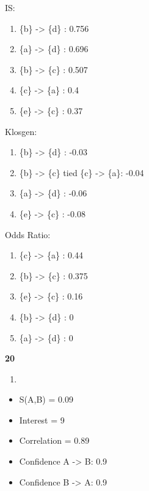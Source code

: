 \documentclass[11pt]{article}
\providecommand{\tightlist}{%
      \setlength{\itemsep}{0pt}\setlength{\parskip}{0pt}}
\begin{document}
IS:

\begin{enumerate}
\def\labelenumi{\arabic{enumi}.}
\item
  \{b\} -\textgreater{} \{d\} : 0.756
\item
  \{a\} -\textgreater{} \{d\} : 0.696
\item
  \{b\} -\textgreater{} \{c\} : 0.507
\item
  \{c\} -\textgreater{} \{a\} : 0.4
\item
  \{e\} -\textgreater{} \{c\} : 0.37
\end{enumerate}

Klosgen:

\begin{enumerate}
\def\labelenumi{\arabic{enumi}.}
\item
  \{b\} -\textgreater{} \{d\} : -0.03
\item
  \{b\} -\textgreater{} \{c\} tied \{c\} -\textgreater{} \{a\}: -0.04
\item
  \{a\} -\textgreater{} \{d\} : -0.06
\item
  \{e\} -\textgreater{} \{c\} : -0.08
\end{enumerate}

Odds Ratio:

\begin{enumerate}
\def\labelenumi{\arabic{enumi}.}
\item
  \{c\} -\textgreater{} \{a\} : 0.44
\item
  \{b\} -\textgreater{} \{c\} : 0.375
\item
  \{e\} -\textgreater{} \{c\} : 0.16
\item
  \{b\} -\textgreater{} \{d\} : 0
\item
  \{a\} -\textgreater{} \{d\} : 0
\end{enumerate}

\textbf{20}

\begin{enumerate}
\def\labelenumi{\alph{enumi}.}
\tightlist
\item
\end{enumerate}

\begin{itemize}
\item
  S(A,B) = 0.09
\item
  Interest = 9
\item
  Correlation = 0.89
\item
  Confidence A -\textgreater{} B: 0.9
\item
  Confidence B -\textgreater{} A: 0.9
\end{itemize}
\end{document}
